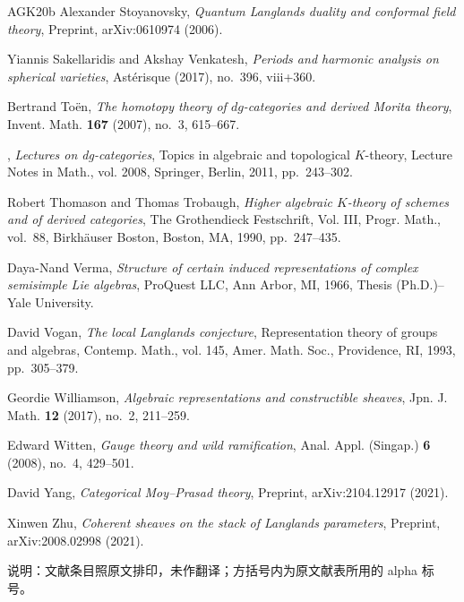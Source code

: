 \begin{thebibliography}{AGK{\etalchar{+}}20b}
Alexander Stoyanovsky, \emph{Quantum {L}anglands duality and conformal field
  theory}, Preprint, arXiv:0610974 (2006).

Yiannis Sakellaridis and Akshay Venkatesh, \emph{Periods and harmonic analysis
  on spherical varieties}, Ast\'{e}risque (2017), no.~396, viii+360.

Bertrand To{\"{e}}n, \emph{The homotopy theory of {$dg$}-categories and derived
  {M}orita theory}, Invent. Math. \textbf{167} (2007), no.~3, 615--667.

\bysame, \emph{Lectures on dg-categories}, Topics in algebraic and topological
  {$K$}-theory, Lecture Notes in Math., vol. 2008, Springer, Berlin, 2011,
  pp.~243--302.

Robert Thomason and Thomas Trobaugh, \emph{Higher algebraic {$K$}-theory of
  schemes and of derived categories}, The {G}rothendieck {F}estschrift, {V}ol.
  {III}, Progr. Math., vol.~88, Birkh\"{a}user Boston, Boston, MA, 1990,
  pp.~247--435.

Daya-Nand Verma, \emph{Structure of certain induced representations of complex
  semisimple {L}ie algebras}, ProQuest LLC, Ann Arbor, MI, 1966, Thesis
  (Ph.D.)--Yale University.

David Vogan, \emph{The local {L}anglands conjecture}, Representation theory of
  groups and algebras, Contemp. Math., vol. 145, Amer. Math. Soc., Providence,
  RI, 1993, pp.~305--379.

Geordie Williamson, \emph{Algebraic representations and constructible sheaves},
  Jpn. J. Math. \textbf{12} (2017), no.~2, 211--259.

Edward Witten, \emph{Gauge theory and wild ramification}, Anal. Appl. (Singap.)
  \textbf{6} (2008), no.~4, 429--501.

David Yang, \emph{Categorical {M}oy--{P}rasad theory}, Preprint,
  arXiv:2104.12917 (2021).

Xinwen Zhu, \emph{Coherent sheaves on the stack of {L}anglands parameters},
  Preprint, arXiv:2008.02998 (2021).

\end{thebibliography}
\vspace{1em}
\noindent\footnotesize 说明：文献条目照原文排印，未作翻译；方括号内为原文献表所用的 alpha 标号。
